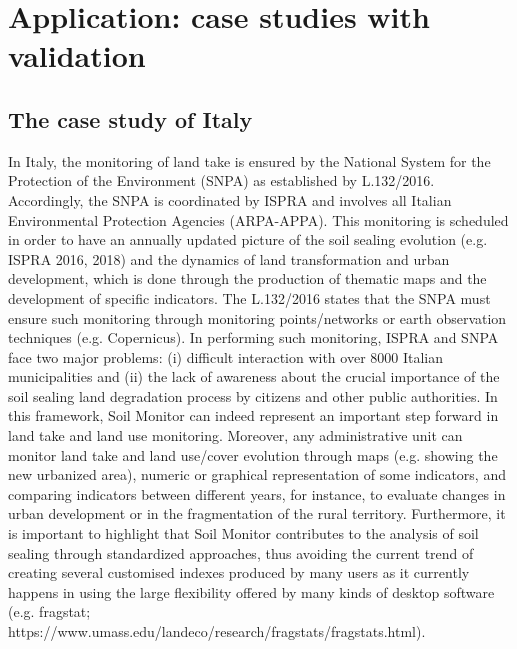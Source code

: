 \documentclass[APA,LATO1COL,doublespace]{WileyNJD-v2}
\begin{document}
\section{Application: case studies with validation}
\subsection{The case study of Italy}
In Italy, the monitoring of land take is ensured by the National System for the Protection of the Environment (SNPA) as established by L.132/2016. Accordingly, the SNPA is coordinated by ISPRA and involves all Italian Environmental Protection Agencies (ARPA-APPA). This monitoring is scheduled in order to have an annually updated picture of the soil sealing evolution (e.g. ISPRA 2016, 2018) and the dynamics of land transformation and urban development, which is done through the production of thematic maps and the development of specific indicators. The L.132/2016 states that the SNPA must ensure such monitoring through monitoring points/networks or earth observation techniques (e.g. Copernicus). In performing such monitoring, ISPRA and SNPA face two major problems: (i) difficult interaction with over 8000 Italian municipalities and (ii) the lack of awareness about the crucial importance of the soil sealing land degradation process by citizens and other public authorities.
In this framework, Soil Monitor can indeed represent an important step forward in land take and land use monitoring. Moreover, any administrative unit can monitor land take and land use/cover evolution through maps (e.g. showing the new urbanized area), numeric or graphical representation of some indicators, and comparing indicators between different years, for instance, to evaluate changes in urban development or in the fragmentation of the rural territory.
Furthermore, it is important to highlight that Soil Monitor contributes to the analysis of soil sealing through standardized approaches, thus avoiding the current trend of creating several customised indexes produced by many users as it currently happens in using the large flexibility offered by many kinds of desktop software (e.g. fragstat; https://www.umass.edu/landeco/research/fragstats/fragstats.html). 
\end{document}
